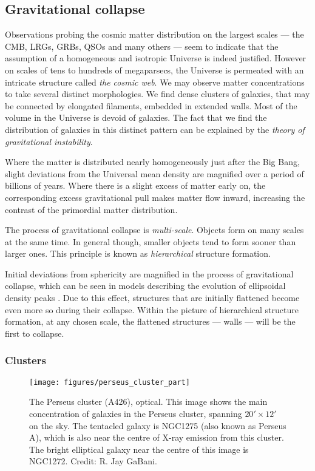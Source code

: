 \subsection{Gravitational collapse}
Observations probing the cosmic matter distribution on the largest scales --- the \ac{CMB}, \acp{LRG}, \acp{GRB}, \acp{QSO} and many others --- seem to indicate that the assumption of a homogeneous and isotropic Universe is indeed justified. However on scales of tens to hundreds of megaparsecs, the Universe is permeated with an intricate structure called \emph{the cosmic web}. We may observe matter concentrations to take several distinct morphologies. We find dense clusters of galaxies, that may be connected by elongated filaments, embedded in extended walls. Most of the volume in the Universe is devoid of galaxies. The fact that we find the distribution of galaxies in this distinct pattern can be explained by the \emph{theory of gravitational instability}.

Where the matter is distributed nearly homogeneously just after the Big Bang, slight deviations from the Universal mean density are magnified over a period of billions of years. Where there is a slight excess of matter early on, the corresponding excess gravitational pull makes matter flow inward, increasing the contrast of the primordial matter distribution.

The process of gravitational collapse is \emph{multi-scale}. Objects form on many scales at the same time. In general though, smaller objects tend to form sooner than larger ones. This principle is known as \emph{hierarchical} structure formation.

Initial deviations from sphericity are magnified in the process of gravitational collapse, which can be seen in models describing the evolution of ellipsoidal density peaks \citep{Lin1965,Barrow1981,Bond1996-a,Sheth2001}. Due to this effect, structures that are initially flattened become even more so during their collapse. Within the picture of hierarchical structure formation, at any chosen scale, the flattened structures --- walls --- will be the first to collapse.

\subsubsection{Clusters}
\begin{figure}
    \texttt{[image: figures/perseus\_cluster\_part]}
    \caption{The Perseus cluster (A426), optical. This image shows the main concentration of galaxies in the Perseus cluster, spanning $20' \times 12'$ on the sky. The tentacled galaxy is NGC1275 (also known as Perseus A), which is also near the centre of X-ray emission from this cluster. The bright elliptical galaxy near the centre of this image is NGC1272. Credit: R. Jay GaBani.}\label{fig:perseus-optical}
\end{figure}

